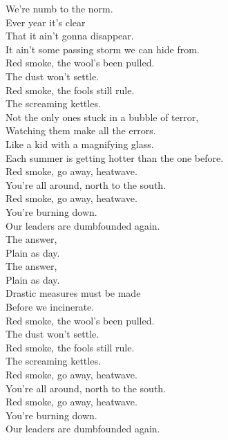 We're numb to the norm. \\
Ever year it's clear \\
That it ain't gonna disappear. \\
It ain't some passing storm we can hide from. \\

Red smoke, the wool's been pulled. \\
The dust won't settle. \\
Red smoke, the fools still rule. \\
The screaming kettles. \\

Not the only ones stuck in a bubble of terror, \\
Watching them make all the errors. \\
Like a kid with a magnifying glass. \\
Each summer is getting hotter than the one before. \\

Red smoke, go away, heatwave. \\
You're all around, north to the south. \\
Red smoke, go away, heatwave. \\
You're burning down. \\
Our leaders are dumbfounded again. \\

The answer, \\
Plain as day. \\
The answer, \\
Plain as day. \\
Drastic measures must be made \\
Before we incinerate. \\

Red smoke, the wool's been pulled. \\
The dust won't settle. \\
Red smoke, the fools still rule. \\
The screaming kettles. \\

Red smoke, go away, heatwave. \\
You're all around, north to the south. \\
Red smoke, go away, heatwave. \\
You're burning down. \\
Our leaders are dumbfounded again. \\


